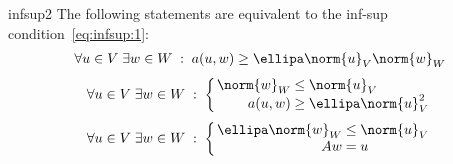 \begin{Lemma}{infsup2}
  The following statements are equivalent to the inf-sup
  condition~\eqref{eq:infsup:1}:
  \begin{gather}
    \label{eq:infsup:2}
    \forall u\in V \;\exists w\in W \;:\; a(u,w) \ge \ellipa \norm{u}_V\norm{w}_W
  \end{gather}
  \begin{gather}
    \label{eq:infsup:3}
    \forall u\in V
    \;\exists w\in W \;:\;
    \left\{
    \arraycolsep0.3ex
    \begin{array}{rcl}
      \norm{w}_W &\le&\norm{u}_V\\
      a(u,w) &\ge& \ellipa \norm{u}_V^2
    \end{array}
    \right.
  \end{gather}
  \begin{gather}
    \label{eq:infsup:3a}
    \forall u\in V
    \;\exists w\in W \;:\;
    \left\{
    \arraycolsep0.3ex
    \begin{array}{rcl}
      \ellipa \norm{w}_W &\le&\norm{u}_V\\
      Aw &=& u
    \end{array}
    \right.
  \end{gather}
\end{Lemma}

